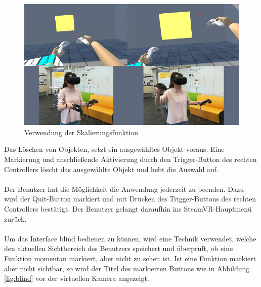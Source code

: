 \begin{figure}[h]
\captionsetup{width=.7\linewidth}
\includegraphics[scale=0.6]{Bilder/Hauptteil/Bearbeitet/SkalierungMerge}
\centering
\caption{Verwendung der Skalierungsfunktion}
\label{fig:skalierung}
\end{figure}

\noindent Das Löschen von Objekten, setzt ein ausgewähltes Objekt voraus. Eine Markierung und anschließende Aktivierung durch den Trigger-Button des rechten Controllers löscht das ausgewählte Objekt und hebt die Auswahl auf.\\
\\
Der Benutzer hat die Möglichkeit die Anwendung jederzeit zu beenden. Dazu wird der Quit-Button markiert und mit Drücken des Trigger-Buttons des rechten Controllers bestätigt. Der Benutzer gelangt daraufhin ins SteamVR-Hauptmenü zurück.\\
\\
Um das Interface blind bedienen zu können, wird eine Technik verwendet, welche den aktuellen Sichtbereich des Benutzers speichert und überprüft, ob eine Funktion momentan markiert, aber nicht zu sehen ist. Ist eine Funktion markiert aber nicht sichtbar, so wird der Titel des markierten Buttons wie in Abbildung \ref{fig:blind} vor der virtuellen Kamera angezeigt.

